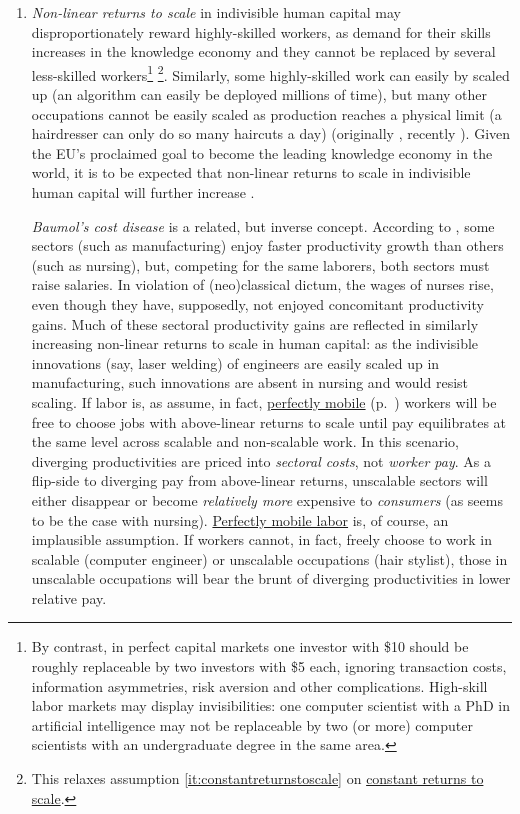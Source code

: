 \begin{enumerate}
	\item {} \label{it:non-linearreturns} \emph{Non-linear returns to scale} in indivisible human capital may disproportionately reward highly-skilled workers, as demand for their skills increases in the knowledge economy and they cannot be replaced by several less-skilled workers\footnote{
		By contrast, in perfect capital markets one investor with \$10 should be roughly replaceable by two investors with \$5 each, ignoring transaction costs, information asymmetries, risk aversion and other complications. High-skill labor markets may display invisibilities:  one computer scientist with a PhD in artificial intelligence may not be replaceable by two (or more) computer scientists with an undergraduate degree in the same area.} \footnote{
		This relaxes  assumption \ref{it:constantreturnstoscale} on \hyperref[it:constantreturnstoscale]{constant returns to scale}.}.
	Similarly, some highly-skilled work can easily by scaled up (an algorithm can  easily be deployed millions of time), but many other occupations cannot be easily scaled as production reaches a physical limit (a hairdresser can only do so many haircuts a day) (originally \citealt{Rosen1981}, recently \citealt{Taleb2007}). Given the \gls{EU}'s proclaimed goal to become the leading knowledge economy in the world, it is to be expected that non-linear returns to scale in indivisible human capital will further increase \citep{Commission2007}.

	\emph{Baumol's cost disease} is a related, but inverse concept. According to \cite{Baumol1965}, some sectors (such as  manufacturing) enjoy faster productivity growth than others (such as nursing), but, competing for the same laborers, both sectors must raise salaries. In violation of (neo)classical dictum, the wages of nurses rise, even though they have, supposedly, not enjoyed concomitant productivity gains. Much of these sectoral productivity gains are reflected in similarly increasing non-linear returns to scale in human capital: as the indivisible innovations (say, laser welding) of engineers are easily scaled up in manufacturing, such innovations are absent in nursing and would resist scaling. If labor is, as \cite{Baumol1965} assume, in fact, \hyperref[it:perfectfactormobility]{perfectly mobile} (p.~\pageref{sec:perfect-competition}) workers will be free to choose jobs with above-linear returns to scale until pay equilibrates at the same level across scalable and non-scalable work. In this scenario, diverging productivities are priced into \emph{sectoral costs}, not \emph{worker pay}. As a flip-side to diverging pay from above-linear returns, unscalable sectors will either disappear or become \emph{relatively more} expensive to \emph{consumers} (as seems to be the case with nursing). \hyperref[it:perfectfactormobility]{Perfectly mobile labor} is, of course, an implausible assumption. If workers cannot, in fact, freely choose to work in scalable (computer engineer) or unscalable occupations (hair stylist), those in unscalable occupations will bear the brunt of diverging productivities in lower relative pay.


\end{enumerate}
